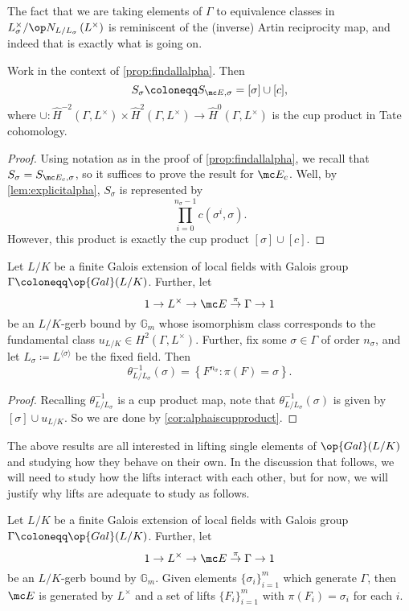 \documentclass{article}
\numberwithin{equation}{section}
\begin{document}
The fact that we are taking elements of $\Gamma$ to equivalence classes in $L_\sigma^\times/\op N_{L/L_\sigma}\left(L^\times\right)$ is reminiscent of the (inverse) Artin reciprocity map, and indeed that is exactly what is going on.
\begin{cor} \label{cor:alphaiscupproduct}
	Work in the context of \autoref{prop:findallalpha}. Then
	\[S_\sigma\coloneqq S_{\mc E,\sigma}=[\sigma]\cup[c],\]
	where $\cup\colon\widehat H^{-2}(\Gamma,L^\times)\times\widehat H^2(\Gamma,L^\times)\to\widehat H^0(\Gamma,L^\times)$ is the cup product in Tate cohomology.
\end{cor}
\begin{proof}
	Using notation as in the proof of \autoref{prop:findallalpha}, we recall that $S_\sigma=S_{\mc E_c,\sigma}$, so it suffices to prove the result for $\mc E_c$. Well, by \autoref{lem:explicitalpha}, $S_\sigma$ is represented by
	\[\prod_{i=0}^{n_\sigma-1}c\left(\sigma^i,\sigma\right).\]
	However, this product is exactly the cup product $[\sigma]\cup[c]$.
\end{proof}
\begin{cor}
	Let $L/K$ be a finite Galois extension of local fields with Galois group $\Gamma\coloneqq\op{Gal}(L/K)$. Further, let
	\[1\to L^\times\to\mc E\stackrel\pi\to\Gamma\to1\]
	be an $L/K$-gerb bound by $\mathbb G_m$ whose isomorphism class corresponds to the fundamental class $u_{L/K}\in H^2(\Gamma,L^\times)$. Further, fix some $\sigma\in\Gamma$ of order $n_\sigma$, and let $L_\sigma\coloneqq L^{\langle\sigma\rangle}$ be the fixed field. Then
	\[\theta_{L/L_\sigma}^{-1}(\sigma)=\left\{F^{n_\sigma}:\pi(F)=\sigma\right\}.\]
\end{cor}
\begin{proof}
	Recalling $\theta_{L/L_\sigma}^{-1}$ is a cup product map, note that $\theta_{L/L_\sigma}^{-1}(\sigma)$ is given by $[\sigma]\cup u_{L/K}$. So we are done by \autoref{cor:alphaiscupproduct}.
\end{proof}
The above results are all interested in lifting single elements of $\op{Gal}(L/K)$ and studying how they behave on their own. In the discussion that follows, we will need to study how the lifts interact with each other, but for now, we will justify why lifts are adequate to study as follows.
\begin{proposition} \label{prop:liftsgenerate}
	Let $L/K$ be a finite Galois extension of local fields with Galois group $\Gamma\coloneqq\op{Gal}(L/K)$. Further, let
	\[1\to L^\times\to\mc E\stackrel\pi\to\Gamma\to1\]
	be an $L/K$-gerb bound by $\mathbb G_m$. Given elements $\{\sigma_i\}_{i=1}^m$ which generate $\Gamma$, then $\mc E$ is generated by $L^\times$ and a set of lifts $\{F_i\}_{i=1}^m$ with $\pi(F_i)=\sigma_i$ for each $i$.
\end{proposition}
\end{document}
